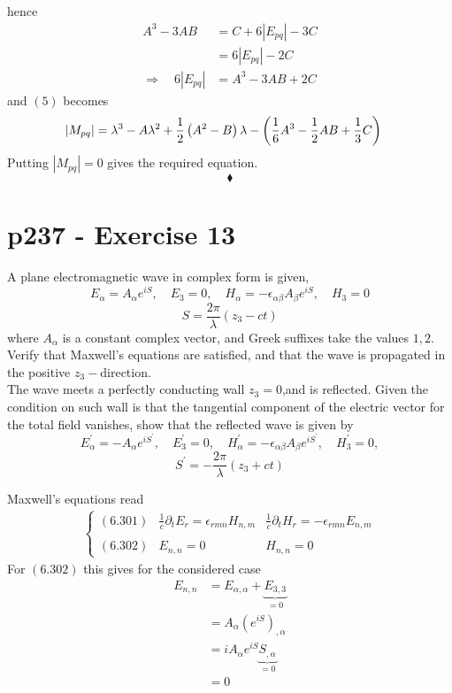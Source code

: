 hence 
\begin{align}
A^3-3AB&= C+ 6\left|E_{pq}\right|-3C\\
&= 6\left|E_{pq}\right|-2C\\
\Rightarrow\quad 6\left|E_{pq}\right|&=A^3-3AB+2C
\end{align}
and $(5)$ becomes
\begin{align}
\left|M_{pq}\right|&= \lambda^3-A\lambda^2 +\frac{1}{2}\left(A^2-B\right)\lambda-\left(\frac{1}{6}A^3-\frac{1}{2} AB+\frac{1}{3}C\right)
\end{align}
Putting $\left|M_{pq}\right|=0$ gives the required equation.
$$\blacklozenge$$
\newpage



\section{p237 - Exercise 13}
\begin{tcolorbox}
A plane electromagnetic wave in complex form is given,
$$E_{\alpha}=A_{\alpha}e^{iS},\quad  E_3=0,\quad H_{\alpha} = -\epsilon_{\alpha\beta}A_{\beta}e^{iS},\quad H_3=0$$ $$ S=\frac{2\pi}{\lambda}\left(z_3-ct\right)$$
where $A_{\alpha}$ is a constant complex vector, and Greek suffixes take the values $1,2$. Verify that Maxwell's equations are satisfied, and that the wave is propagated in the positive $z_3-$direction.\\
The wave meets a perfectly conducting wall $z_3=0$,and is reflected. Given the condition on such wall is that the tangential component of the electric vector for the total field vanishes, show that the reflected wave is given by
$$E^{'}_{\alpha}=-A_{\alpha}e^{iS^{'}},\quad E^{'}_{3}=0, \quad H^{'}_{\alpha} = -\epsilon_{\alpha\beta} A_{\beta}e^{iS^{'}},\quad H^{'}_3=0,$$
$$S^{'}= -\frac{2\pi}{\lambda}\left(z_3+ct\right)$$
\end{tcolorbox}
Maxwell's equations read 
\begin{align}
\left\{\begin{array}{lll}(6.301)& \frac{1}{c}\partial_t E_r=\epsilon_{rmn}H_{n,m}& \frac{1}{c}\partial_t H_r=-\epsilon_{rmn}E_{n,m}\\\\
(6.302)&E_{n,n}=0&H_{n,n}=0
\end{array}\right.
\end{align}
For $\mathbf{(6.302)}$ this gives for the considered case
\begin{align}
E_{n,n}&=E_{\alpha,\alpha}+ \underbrace{E_{3,3}}_{=0}\\
&=A_{\alpha}\left(e^{iS}\right)_{,\alpha}\\
&=iA_{\alpha}e^{iS}\underbrace{S_{,\alpha}}_{=0}\\
&=0
\end{align}
